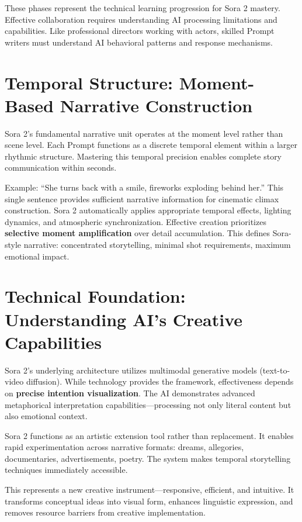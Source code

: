 These phases represent the technical learning progression for Sora 2 mastery. Effective collaboration requires understanding AI processing limitations and capabilities. Like professional directors working with actors, skilled Prompt writers must understand AI behavioral patterns and response mechanisms.

\section{Temporal Structure: Moment-Based Narrative Construction}

Sora 2's fundamental narrative unit operates at the moment level rather than scene level. Each Prompt functions as a discrete temporal element within a larger rhythmic structure. Mastering this temporal precision enables complete story communication within seconds.

Example: ``She turns back with a smile, fireworks exploding behind her.'' This single sentence provides sufficient narrative information for cinematic climax construction. Sora 2 automatically applies appropriate temporal effects, lighting dynamics, and atmospheric synchronization. Effective creation prioritizes \textbf{selective moment amplification} over detail accumulation. This defines Sora-style narrative: concentrated storytelling, minimal shot requirements, maximum emotional impact.

\section{Technical Foundation: Understanding AI's Creative Capabilities}

Sora 2's underlying architecture utilizes multimodal generative models (text-to-video diffusion). While technology provides the framework, effectiveness depends on \textbf{precise intention visualization}. The AI demonstrates advanced metaphorical interpretation capabilities---processing not only literal content but also emotional context.

Sora 2 functions as an artistic extension tool rather than replacement. It enables rapid experimentation across narrative formats: dreams, allegories, documentaries, advertisements, poetry. The system makes temporal storytelling techniques immediately accessible.

This represents a new creative instrument---responsive, efficient, and intuitive. It transforms conceptual ideas into visual form, enhances linguistic expression, and removes resource barriers from creative implementation.


